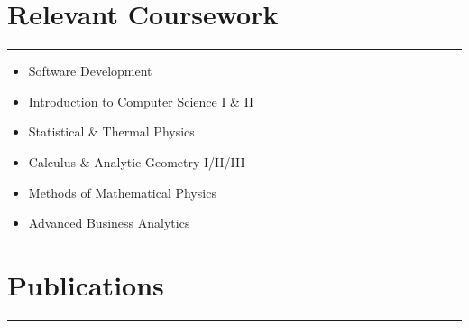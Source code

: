 \documentclass[11pt,a4paper]{article}
\begin{document}
\section*{Relevant Coursework}
\hrule

\begin{multicols}{2}
\begin{itemize}[noitemsep] %
    \item Software Development
    \item Introduction to Computer Science I \& II
    \item Statistical \& Thermal Physics
    \item Calculus \& Analytic Geometry I/II/III
    \item Methods of Mathematical Physics
    \item Advanced Business Analytics
\end{itemize}

\end{multicols}

\section*{Publications}
\hrule
\vspace{6mm} %


\end{document}
